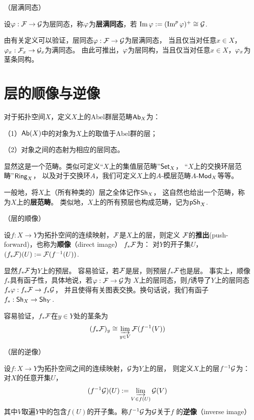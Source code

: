 \begin{definition}（层满同态）

设$\varphi:\mathcal{F}\to\mathcal{G}$为层同态，称$\varphi$为\textbf{层满同态}，若
$\operatorname{Im}\varphi:=(\operatorname{Im}^p\varphi)^+\cong\mathcal{G}$.
\end{definition}

由有关定义可以验证，层同态$\varphi:\mathcal{F}\to\mathcal{G}$为层满同态，
当且仅当对任意$x\in X$，$\varphi_x:\mathcal{F}_x\to\mathcal{G}_x$为满同态。
由此可推出，$\varphi$为层同构，当且仅当对任意$x\in X$，$\varphi_x$为茎条同构。

\section{层的顺像与逆像}

\begin{notation}对于拓扑空间$X$，定义$X$上的Abel群层范畴$\operatorname{\mathsf{Ab}}_X$为：

（1）$\operatorname{\mathsf{Ab}}(X)$中的对象为$X$上的取值于Abel群的层；

（2）对象之间的态射为相应的层同态。
\end{notation}
显然这是一个范畴。类似可定义“$X$上的集值层范畴”$\operatorname{\mathsf{Set}}_X$，
“$X$上的交换环层范畴”$\operatorname{\mathsf{Ring}}_X$，
以及对于交换环$A$，我们可定义$X$上的$A$-模层范畴$A\operatorname{\!\text{-}\mathsf{Mod}}_X$等等。

一般地，将$X$上（所有种类的）层之全体记作$\operatorname{\mathsf{Sh}}_X$，
这自然也给出一个范畴，称为$X$上的\textbf{层范畴}。
类似地，$X$上的所有预层也构成范畴，记为$\operatorname{\mathsf{pSh}}_X$.

\begin{definition}（层的顺像）

设$f:X\to Y$为拓扑空间的连续映射，$\mathcal{F}$是$X$上的层，则定义
$\mathcal{F}$的\textbf{推出}(push-forward)，也称为\textbf{顺像}（direct image）
$f_*\mathcal{F}$为：
对$Y$的开子集$U$，$(f_*\mathcal{F})(U):=\mathcal{F}(f^{-1}(U))$.
\end{definition}

显然$f_*\mathcal{F}$为$Y$上的预层。
容易验证，若$\mathcal{F}$是层，则预层$f_*\mathcal{F}$也是层。
事实上，顺像$f_*$具有函子性，具体地说，若$\varphi:\mathcal{F}\to\mathcal{G}$为
$X$上的层同态，则$f$诱导了$Y$上的层同态$f_*\varphi:f_*\mathcal{F}\to f_*\mathcal{G}$，
并且使得有关图表交换。换句话说，我们有函子$f_*:\operatorname{\mathsf{Sh}}_X\to\operatorname{\mathsf{Sh}}_Y$.

容易验证，$f_*\mathcal{F}$在$y\in Y$处的茎条为
$$
  (f_*\mathcal{F})_y\cong
\varinjlim_{y\in V}\mathcal{F}(f^{-1}(V))
$$

\begin{definition}（层的逆像）
\label{层的逆像-def}

设$f:X\to Y$为拓扑空间之间的连续映射，$\mathcal{G}$为$Y$上的层，
则定义$X$上的层$f^{-1}\mathcal{G}$为：对$X$的任意开集$U$，
$$
  (f^{-1}\mathcal{G})(U)
:=\varinjlim_{V\in f(U)}\mathcal{G}(V)
$$
其中$V$取遍$Y$中的包含$f(U)$的开子集。称$f^{-1}\mathcal{G}$为$\mathcal{G}$关于$f$
的\textbf{逆像}（inverse image）
\end{definition}

